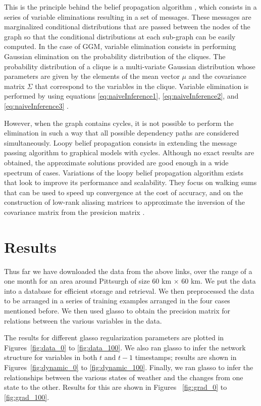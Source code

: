 \documentclass{article}
\begin{document}
This is the principle behind the belief propagation algorithm \cite{Koller2009},
which consists in a series of variable eliminations resulting in a set of
messages. These messages are marginalized conditional distributions that are
passed between the nodes of the graph so that the conditional distributions at
each sub-graph can be easily computed. In the case of GGM, variable elimination
consists in performing Gaussian elimination on the probability
distribution of the cliques. The probability distribution of a clique is
a multi-variate Gaussian distribution whose parameters are given by the
elements of the mean vector $\mu$ and the covariance matrix $\Sigma$ that
correspond to the variables in the clique. Variable elimination is performed by
using equations \ref{eq:naiveInference1}, \ref{eq:naiveInference2}, and
\ref{eq:naiveInference3} \cite{malioutov2008approximate}.

However, when the graph contains cycles, it is not possible to perform the
elimination in such a way that all possible dependency paths are considered
simultaneously. Loopy belief propagation \cite{murphy1999} consists in extending
the message passing algorithm to graphical models with cycles.
Although no exact results are obtained, the approximate solutions provided are
good enough in a wide spectrum of cases. Variations of the loopy belief
propagation algorithm exists that look to improve its performance and
scalability. They focus on walking sums that can be used to speed up convergence
at the cost of accuracy, and on the construction of low-rank aliasing matrices
to approximate the inversion of the covariance matrix from the presicion matrix
\cite{malioutov2008approximate}.

\section{Results}

Thus far we have downloaded the data from the above links, over the range of a
one month for an area around Pittsurgh of size 60 km $\times$ 60 km. We put the
data into a database for efficient storage and retrieval. We then preprocessed the
data to be arranged in a series of training examples arranged in the four cases
mentioned before. We then used glasso to obtain the precision matrix for
relations between the various variables in the data.

The results for different glasso regularization parameters are plotted in
Figures~\ref{fig:data_0} to \ref{fig:data_100}. We also ran glasso to infer the
network structure for variables in both $t$ and $t - 1$ timestamps; results are
shown in Figures~\ref{fig:dynamic_0} to \ref{fig:dynamic_100}. Finally, we ran
glasso to infer the relationships between the various states of weather and the
changes from one state to the other. Results for this are shown in Figures~
\ref{fig:grad_0} to \ref{fig:grad_100}.
\end{document}
